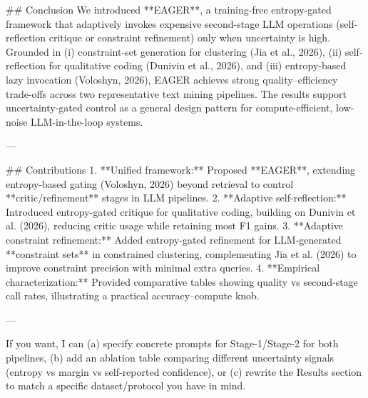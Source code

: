 ## Conclusion
We introduced **EAGER**, a training-free entropy-gated framework that adaptively invokes expensive second-stage LLM operations (self-reflection critique or constraint refinement) only when uncertainty is high. Grounded in (i) constraint-set generation for clustering (Jia et al., 2026), (ii) self-reflection for qualitative coding (Dunivin et al., 2026), and (iii) entropy-based lazy invocation (Voloshyn, 2026), EAGER achieves strong quality–efficiency trade-offs across two representative text mining pipelines. The results support uncertainty-gated control as a general design pattern for compute-efficient, low-noise LLM-in-the-loop systems.

---

## Contributions
1. **Unified framework:** Proposed **EAGER**, extending entropy-based gating (Voloshyn, 2026) beyond retrieval to control **critic/refinement** stages in LLM pipelines.
2. **Adaptive self-reflection:** Introduced entropy-gated critique for qualitative coding, building on Dunivin et al. (2026), reducing critic usage while retaining most F1 gains.
3. **Adaptive constraint refinement:** Added entropy-gated refinement for LLM-generated **constraint sets** in constrained clustering, complementing Jia et al. (2026) to improve constraint precision with minimal extra queries.
4. **Empirical characterization:** Provided comparative tables showing quality vs second-stage call rates, illustrating a practical accuracy–compute knob.

--- 

If you want, I can (a) specify concrete prompts for Stage-1/Stage-2 for both pipelines, (b) add an ablation table comparing different uncertainty signals (entropy vs margin vs self-reported confidence), or (c) rewrite the Results section to match a specific dataset/protocol you have in mind.
